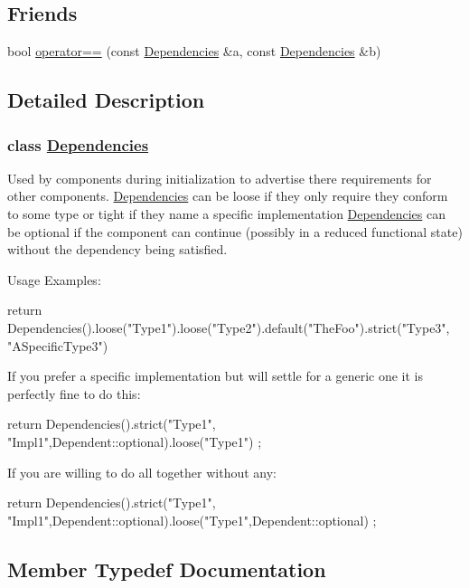 \subsection*{Friends}
\begin{DoxyCompactItemize}
\item 
bool \hyperlink{classtheoria_1_1core_1_1Dependencies_a3fef4fe6d625d0698807b631fa90db4b}{operator==} (const \hyperlink{classtheoria_1_1core_1_1Dependencies}{Dependencies} \&a, const \hyperlink{classtheoria_1_1core_1_1Dependencies}{Dependencies} \&b)
\end{DoxyCompactItemize}


\subsection{Detailed Description}
\subsubsection*{class \hyperlink{classtheoria_1_1core_1_1Dependencies}{Dependencies} }

Used by components during initialization to advertise there requirements for other components. \hyperlink{classtheoria_1_1core_1_1Dependencies}{Dependencies} can be loose if they only require they conform to some type or tight if they name a specific implementation \hyperlink{classtheoria_1_1core_1_1Dependencies}{Dependencies} can be optional if the component can continue (possibly in a reduced functional state) without the dependency being satisfied.

Usage Examples\+: \begin{DoxyVerb}  return Dependencies().loose("Type1").loose("Type2").default("TheFoo").strict("Type3", "ASpecificType3") 
\end{DoxyVerb}


If you prefer a specific implementation but will settle for a generic one it is perfectly fine to do this\+: \begin{DoxyVerb}  return  Dependencies().strict("Type1", "Impl1",Dependent::optional).loose("Type1") ;
\end{DoxyVerb}


If you are willing to do all together without any\+: \begin{DoxyVerb}  return  Dependencies().strict("Type1", "Impl1",Dependent::optional).loose("Type1",Dependent::optional) ;\end{DoxyVerb}
 

\subsection{Member Typedef Documentation}
\mbox{\label{classtheoria_1_1core_1_1Dependencies_af58b879e807df8fb52b96c9ab1eb6073}} 
